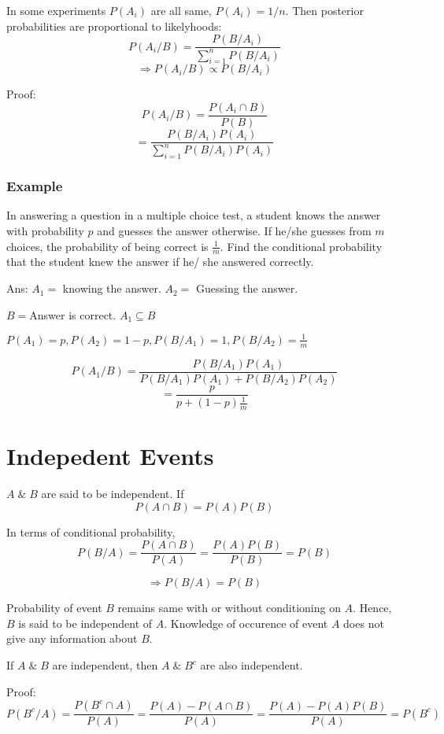 \documentclass{article}
\begin{document}
In some experiments $P(A_i)$ are all same, $P(A_i)=1/n$. Then posterior probabilities are proportional to likelyhoods:
$$ P(A_i/B)= \frac{P(B/A_i)}{\sum_{i=1}^n P(B/A_i)}$$
$$ \Rightarrow P(A_i/B) \propto P(B/A_i)$$

Proof:
$$ P(A_i/B) = \frac{P(A_i \cap B)}{P(B)}$$
$$ = \frac{P(B/A_i)P(A_i)}{\sum_{i=1}^{n} P(B/A_i)P(A_i)}$$

\subsubsection{Example}
In answering a question in a multiple choice test, a student knows the answer with probability $p$ and guesses the answer otherwise. If he/she guesses from $m$ choices, the probability of being correct is $\frac{1}{m}$. Find the conditional probability that the student knew the answer if he/ she answered correctly.

Ans: $A_1=$ knowing the answer. $A_2=$ Guessing the answer.

$B= $Answer is correct. $A_1 \subseteq B$

$P(A_1)= p, P(A_2)= 1-p, P(B/A_1)= 1, P(B/A_2)= \frac{1}{m}$

$$ P(A_1/B)= \frac{P(B/A_1)P(A_1)}{P(B/A_1)P(A_1)+ P(B/A_2)P(A_2)}$$
$$ = \frac{p}{p + (1-p)\frac{1}{m}}$$

\section{Indepedent Events}
$A \;\&\; B$ are said to be independent. If
$$ P(A \cap B) = P(A)P(B)$$

In terms of conditional probability,
$$ P(B/A)= \frac{P(A \cap B)}{P(A)} = \frac{P(A)P(B)}{P(B)} = P(B)$$

$$ \Rightarrow P(B/A) = P(B)$$

Probability of event $B$ remains same with or without conditioning on $A$. Hence, $B$ is said to be independent of $A$.
Knowledge of occurence of event $A$ does not give any information about $B$.

If $A\; \&\; B $ are independent, then
$ A \;\&\; B^c$ are also independent.

Proof:
$$ P(B^c / A)= \frac{P(B^c \cap A)}{P(A)}= \frac{P(A)- P(A \cap B)}{P(A)}= \frac{P(A)- P(A)P(B)}{P(A)} = P(B^c)$$
\end{document}
